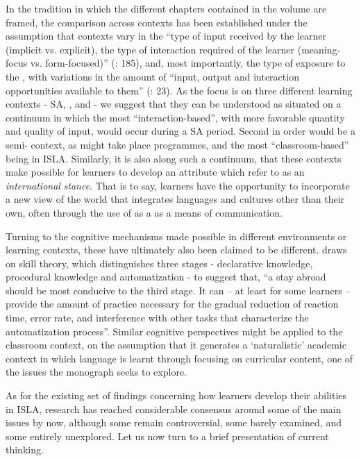 \documentclass[output=paper]{langsci/langscibook}
\begin{document}
In the  tradition in which the different chapters contained in the volume are framed, the comparison across contexts has been established under the assumption that contexts vary in the “type of input received by the learner (implicit vs. explicit), the type of interaction required of the learner (meaning-focus vs. form-focused)” (\citealt{LeonardShea2017}: 185), and, most importantly, the type of exposure to the , with variations in the amount of “input, output and interaction opportunities available to them” (\citealt{Pérez-Vidal2014}: 23). As the focus is on three different learning contexts - SA, , and  - we suggest that they can be understood as situated on a continuum in which the most “interaction-based”, with more favorable quantity and quality of input, would occur during a SA period. Second in order would be a semi- context, as might take place  programmes, and the most “classroom-based” being  in ISLA. Similarly, it is also along such a continuum, that these contexts make possible for learners to develop an attribute which \citet{UshiodaDörnyei2012} refer to as an \textit{international} \textit{stance}. That is to say, learners have the opportunity to incorporate a new view of the world that integrates languages and cultures other than their own, often through the use of  as a  as a means of communication.

Turning to the cognitive mechanisms made possible in different  environments or learning contexts, these have ultimately also been claimed to be different. \citet[213]{DeKeyser2007} draws on skill  theory, which distinguishes three stages -  declarative knowledge, procedural knowledge and automatization -  to suggest that, “a stay abroad should be most conducive to the third stage. It can – at least for some learners – provide the amount of practice necessary for the gradual reduction of reaction time, error rate, and interference with other tasks that characterize the automatization process”. Similar cognitive perspectives might be applied to the classroom  context, on the assumption that it generates a ‘naturalistic’ academic context in which language is learnt through focusing on curricular content, one of the issues the monograph seeks to explore. 

  
As for the existing set of findings concerning how learners develop their  abilities in ISLA, research has reached considerable consensus around some of the main issues by now, although some remain controversial, some barely examined, and some entirely unexplored. Let us now turn to a brief presentation of current thinking.  
\end{document}
